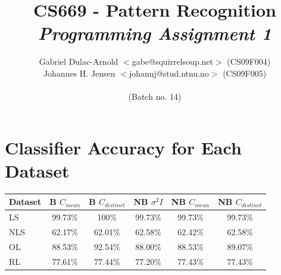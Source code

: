 \documentclass[a4paper]{article}
\author{Gabriel Dulac-Arnold $<$gabe@squirrelsoup.net$>$ (CS09F004) \\
Johannes H. Jensen $<$johannj@stud.ntnu.no$>$ (CS09F005) \\
\\
(Batch no. 14)}
\title{CS669 - Pattern Recognition\\
\emph{Programming Assignment 1}}
\begin{document}
\setlength{\parskip}{2ex}
\maketitle

\section{Classifier Accuracy for Each Dataset}

\begin{tabular}{ l | c | c | c | c | c | }
Dataset & B $C_{mean}$ & B $C_{distinct}$ & NB $\sigma^2 I$ & NB $C_{mean}$ & NB $C_{distinct}$\\
\hline
  LS & 99.73\% & 100\% & 99.73\% & 99.73\% & 99.73\% \\ 
\hline
  NLS & 62.17\% & 62.01\% & 62.58\% & 62.42\% & 62.58\% \\
\hline
  OL & 88.53\% & 92.54\% & 88.00\% & 88.53\% & 89.07\% \\
\hline
  RL & 77.61\% & 77.44\% & 77.20\% & 77.43\% & 77.43\% \\
\hline
\end{tabular}
\end{document}

